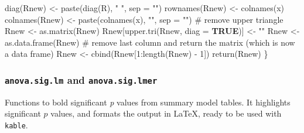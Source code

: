 \documentclass[
  bookmarksnumbered]{article}
\newenvironment{Shaded}{\begin{snugshade}}{\end{snugshade}}
\newcommand{\AttributeTok}[1]{\textcolor[rgb]{0.80,0.80,0.80}{#1}}
\newcommand{\CommentTok}[1]{\textcolor[rgb]{0.50,0.62,0.50}{#1}}
\newcommand{\ConstantTok}[1]{\textcolor[rgb]{0.86,0.64,0.64}{\textbf{#1}}}
\newcommand{\DecValTok}[1]{\textcolor[rgb]{0.86,0.86,0.80}{#1}}
\newcommand{\FunctionTok}[1]{\textcolor[rgb]{0.94,0.94,0.56}{#1}}
\newcommand{\NormalTok}[1]{\textcolor[rgb]{0.80,0.80,0.80}{#1}}
\newcommand{\OtherTok}[1]{\textcolor[rgb]{0.94,0.94,0.56}{#1}}
\newcommand{\SpecialCharTok}[1]{\textcolor[rgb]{0.86,0.64,0.64}{#1}}
\newcommand{\StringTok}[1]{\textcolor[rgb]{0.80,0.58,0.58}{#1}}
\begin{document}
\begin{Shaded}
\begin{Highlighting}[]
  \FunctionTok{diag}\NormalTok{(Rnew) }\OtherTok{\textless{}{-}} \FunctionTok{paste}\NormalTok{(}\FunctionTok{diag}\NormalTok{(R), }\StringTok{" "}\NormalTok{, }
                      \AttributeTok{sep =} \StringTok{""}\NormalTok{)}
  \FunctionTok{rownames}\NormalTok{(Rnew) }\OtherTok{\textless{}{-}} \FunctionTok{colnames}\NormalTok{(x)}
  \FunctionTok{colnames}\NormalTok{(Rnew) }\OtherTok{\textless{}{-}} \FunctionTok{paste}\NormalTok{(}\FunctionTok{colnames}\NormalTok{(x), }\StringTok{""}\NormalTok{, }
                          \AttributeTok{sep =} \StringTok{""}\NormalTok{)}
  \CommentTok{\# remove upper triangle}
\NormalTok{  Rnew }\OtherTok{\textless{}{-}} \FunctionTok{as.matrix}\NormalTok{(Rnew)}
\NormalTok{  Rnew[}\FunctionTok{upper.tri}\NormalTok{(Rnew, }\AttributeTok{diag =} \ConstantTok{TRUE}\NormalTok{)] }\OtherTok{\textless{}{-}} \StringTok{""}
\NormalTok{  Rnew }\OtherTok{\textless{}{-}} \FunctionTok{as.data.frame}\NormalTok{(Rnew)}
  \CommentTok{\# remove last column and return the matrix (which is now a data frame)}
\NormalTok{  Rnew }\OtherTok{\textless{}{-}} \FunctionTok{cbind}\NormalTok{(Rnew[}\DecValTok{1}\SpecialCharTok{:}\FunctionTok{length}\NormalTok{(Rnew) }\SpecialCharTok{{-}} \DecValTok{1}\NormalTok{])}
  \FunctionTok{return}\NormalTok{(Rnew)}
\NormalTok{\}}
\end{Highlighting}
\end{Shaded}

\subsubsection{\texorpdfstring{\texttt{anova.sig.lm} and \texttt{anova.sig.lmer}}{anova.sig.lm and anova.sig.lmer}}\label{anova.sig.lm-and-anova.sig.lmer}

Functions to bold significant \emph{p} values from summary model tables. It highlights significant \(p\) values, and formats the output in \LaTeX, ready to be used with \texttt{kable}.
\end{document}

